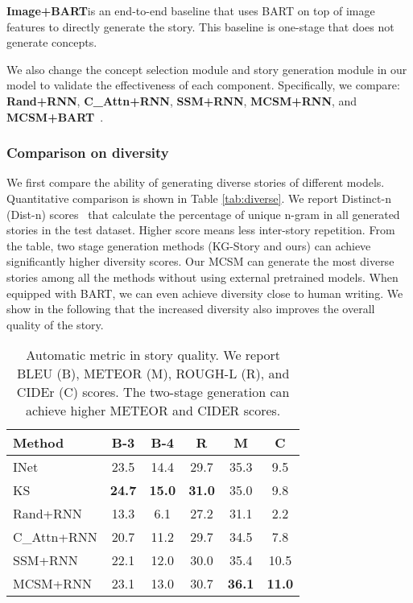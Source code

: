 \noindent\textbf{Image+BART}\dag is an end-to-end baseline that uses BART on top of image features to directly generate the story. This baseline is one-stage that does not generate concepts.

We also change the concept selection module and story generation module in our model to validate the effectiveness of each component. Specifically, we compare: \textbf{Rand+RNN}, \textbf{C\_Attn+RNN}, \textbf{SSM+RNN}, \textbf{MCSM+RNN}, and \textbf{MCSM+BART}\dag~.

\subsubsection{Comparison on diversity}
We first compare the ability of generating diverse stories of different models. Quantitative comparison is shown in Table \ref{tab:diverse}. We report Distinct-n (Dist-n) scores~\cite{li2015dist} that calculate the percentage of unique n-gram in all generated stories in the test dataset. Higher score means less inter-story repetition. 
From the table, two stage generation methods (KG-Story and ours) can achieve significantly higher diversity scores. 
Our MCSM can generate the most diverse stories among all the methods without using external pretrained models.
When equipped with BART, we can even achieve diversity close to human writing.
We show in the following that the increased diversity also improves the overall quality of the story.

\begin{table}[t]
\centering
\begin{tabular}{l|c|c|c|c|c}
\hline
 Method& B-3& B-4 & R& M & C\\\hline\hline
 INet& 23.5&14.4&29.7&35.3&9.5\\\hline
 KS&\textbf{24.7}&\textbf{15.0}&\textbf{31.0}&35.0&9.8\\\hline
 \hline
 Rand+RNN&  13.3&6.1&27.2&31.1&2.2\\\hline
 C\_Attn+RNN&20.7&11.2&29.7&34.5&7.8\\\hline
 SSM+RNN &22.1&12.0&30.0&35.4&10.5\\\hline
 MCSM+RNN&23.1&13.0&30.7&\textbf{36.1}&\textbf{11.0}\\
 \hline
\end{tabular}
\caption{Automatic metric in story quality. We report BLEU (B), METEOR (M), ROUGH-L (R), and CIDEr (C) scores. The two-stage generation can achieve higher METEOR and CIDER scores.}
\label{tab:am}
\end{table}



